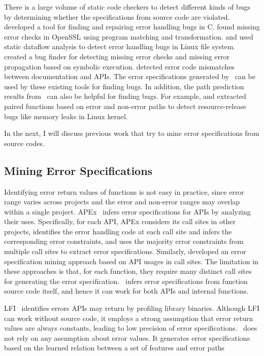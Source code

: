 \documentclass[12pt]{report}	%
\begin{document}
There is a large volume of static code checkers to 
detect different kinds of bugs by determining 
whether the specifications from source code are violated.
\cite{Tian:2017:ADR} developed a tool for finding 
and repairing error handling bugs in C.
\cite{lawall2010finding} found missing error checks in OpenSSL
using program matching and transformation.
\cite{gunawi2008eio} and \cite{Rubio-Gonzalez:2009:EPA:1542476.1542506} 
used static dataflow analysis to detect error handling bugs in Linux file system. 
\cite{jana2016automatically} created a bug finder for detecting missing error checks
and missing error propagation based on symbolic execution.
\cite{rubio2010expect} detected error code mismatches between documentation and APIs.
%
The error specifications generated by \newTool\
can be used by these existing tools
for finding bugs.
%
In addition, the path prediction results from \newTool\
can also be helpful for finding bugs.
For example, \cite{liu2014pf} and \cite{bai2015automated}
extracted paired functions based on error and non-error paths
to detect resource-release bugs like memory leaks in Linux kernel. 

In the next, I will discuss previous work that try to mine error specifications from source codes.

\subsection{Mining Error Specifications}

Identifying error return values of functions is not easy in practice,
since error range varies across projects
and the error and non-error ranges may overlap within a single project.
%
APEx~\cite{Kang:2016:AAI:2970276.2970354} infers error specifications for APIs
by analyzing their uses. Specifically, for each API, APEx 
considers its call sites in other projects,  
identifies the error handling code at each call site
and infers the corresponding error constraints,
and uses the majority error constraints from multiple call sites to extract error specifications.
%
Similarly, \cite{Acharya:2009:MAE}
developed an error specification mining approach based on API usages in call sites. 
The limitation in these approaches is that, for each function,
they require many distinct call sites for generating the error specification.
\newTool\ infers error specifications from function source code itself,
and hence it can work for both APIs and internal functions.

LFI~\cite{marinescu2011efficient} identifies errors APIs may return
by profiling library binaries.
Although LFI can work without source code,
it employs a strong assumption that error return values are always constants,
leading to low precision of error specifications.
\newTool\ does not rely on any assumption about error values.
It generates error specifications based on the learned relation between a set of features and error paths
\end{document}
